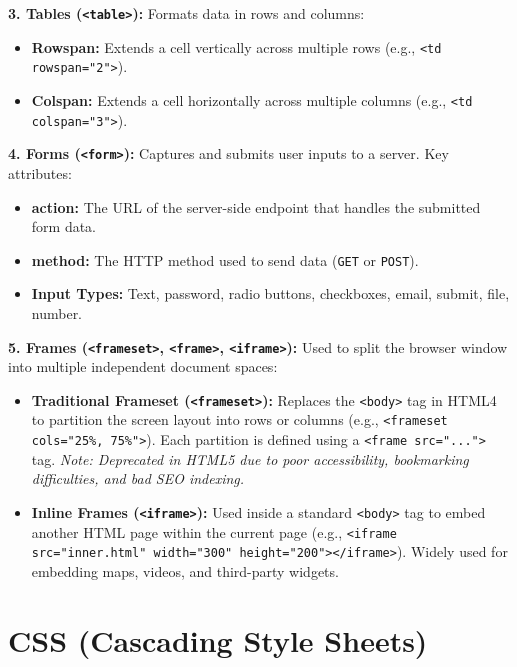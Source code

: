 \documentclass[12pt,a4paper]{article}
\begin{document}
\textbf{3. Tables (\texttt{<table>}):} Formats data in rows and columns:
\begin{itemize}[leftmargin=*, itemsep=3pt]
  \item \textbf{Rowspan:} Extends a cell vertically across multiple rows (e.g., \texttt{<td rowspan="2">}).
  \item \textbf{Colspan:} Extends a cell horizontally across multiple columns (e.g., \texttt{<td colspan="3">}).
\end{itemize}

\textbf{4. Forms (\texttt{<form>}):} Captures and submits user inputs to a server. Key attributes:
\begin{itemize}[leftmargin=*, itemsep=3pt]
  \item \textbf{action:} The URL of the server-side endpoint that handles the submitted form data.
  \item \textbf{method:} The HTTP method used to send data (\texttt{GET} or \texttt{POST}).
  \item \textbf{Input Types:} Text, password, radio buttons, checkboxes, email, submit, file, number.
\end{itemize}

\textbf{5. Frames (\texttt{<frameset>}, \texttt{<frame>}, \texttt{<iframe>}):} Used to split the browser window into multiple independent document spaces:
\begin{itemize}[leftmargin=*, itemsep=3pt]
  \item \textbf{Traditional Frameset (\texttt{<frameset>}):} Replaces the \texttt{<body>} tag in HTML4 to partition the screen layout into rows or columns (e.g., \texttt{<frameset cols="25\%, 75\%">}). Each partition is defined using a \texttt{<frame src="...">} tag. \textit{Note: Deprecated in HTML5 due to poor accessibility, bookmarking difficulties, and bad SEO indexing.}
  \item \textbf{Inline Frames (\texttt{<iframe>}):} Used inside a standard \texttt{<body>} tag to embed another HTML page within the current page (e.g., \texttt{<iframe src="inner.html" width="300" height="200"></iframe>}). Widely used for embedding maps, videos, and third-party widgets.
\end{itemize}

\section{CSS (Cascading Style Sheets)}
\end{document}
